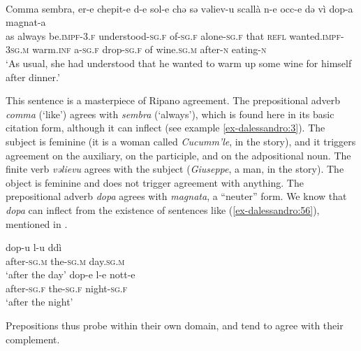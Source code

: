 \documentclass[output=paper
,modfonts
,nonflat]{langsci/langscibook}
\begin{document}
\begin{exe}
\ex \citet[78]{Lambertelli2003}\\
	\gll Comma   sembra,   er-e     chepit-e     d-e   sol-e     chǝ sǝ   vǝliev-u     scallà     n-e   occ-e     dǝ   vì dop-a   magnat-a\\
	as always   be.\textsc{impf-3.f} understood-\textsc{sg.f} of-\textsc{sg.f}   alone-\textsc{sg.f} that \textsc{refl} wanted.\textsc{impf-3sg.m} warm.\textsc{inf} a-\textsc{sg.f} drop-\textsc{sg.f} of   wine.\textsc{sg.m} after-\textsc{n}   eating-\textsc{n}\\
	\glt `As usual, she had understood that he wanted to warm up some wine for himself after dinner.'
\end{exe}
This sentence is a masterpiece of Ripano agreement. The prepositional adverb \textit{comma} (‘like’) agrees with \textit{sembra} (‘always’), which is found here in its basic citation form, although it can inflect (see example \ref{ex-dalessandro:3}). The subject is feminine (it is a woman called \textit{Cucumm’le}, in the story), and it triggers agreement on the auxiliary, on the participle, and on the adpositional noun. The finite verb \textit{vǝlievu} agrees with the subject (\textit{Giuseppe}, a man, in the story). The object is feminine and does not trigger agreement with anything. The prepositional adverb \textit{dopa} agrees with \textit{magnata}, a “neuter” form. We know that \textit{dopa} can inflect from the existence of sentences like (\ref{ex-dalessandro:56}), mentioned in \citet{Ledgeway2012}.

\begin{exe}
	\ex\label{ex-dalessandro:56} \citet[309]{Ledgeway2012} \xlist
	\ex 
	\gll dop-u     l-u     ddì\\
	after-\textsc{sg.m} the-\textsc{sg.m} day.\textsc{sg.m}\\
	\glt `after the day' 
	\ex
	\gll   dop-e     l-e     nott-e\\
	after-\textsc{sg.f} the-\textsc{sg.f} night-\textsc{sg.f}\\
	\glt `after the night' 
	\endxlist
\end{exe}
Prepositions thus probe within their own domain, and tend to agree with their complement.
\end{document}
